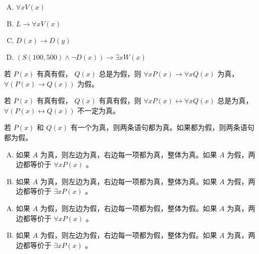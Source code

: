 {{        %
        \begin{practices}
            \begin{enumerate}[A.]
                \item $\forall x V(x)$
                \item $L \rightarrow \forall x V(x)$
                \item $D(x) \rightarrow D(y)$
                \item $(S(100, 500) \wedge \neg D(x)) \rightarrow \exists x W(x)$
            \end{enumerate}
        \end{practices}

        \begin{practices}
            若 $P(x)$ 有真有假， $Q(x)$ 总是为假，则 $\forall x P(x) \rightarrow \forall x Q(x)$ 为真， $\forall (P(x) \rightarrow Q(x))$ 为假。
        \end{practices}

        \begin{practices}
            若 $P(x)$ 有真有假， $Q(x)$ 有真有假，则 $\forall x P(x) \leftrightarrow \forall x Q(x)$ 总是为真， $\forall (P(x) \leftrightarrow Q(x))$ 不一定为真。
        \end{practices}

        \begin{practices}
            若 $P(x)$ 和 $Q(x)$ 有一个为真，则两条语句都为真。如果都为假，则两条语句都为假。
        \end{practices}

        \begin{practices}
            \begin{enumerate}[A.]
                \item 如果 $A$ 为真，则左边为真，右边每一项都为真，整体为真。如果 $A$ 为假，两边都等价于 $\forall x P(x)$ 。
                \item 如果 $A$ 为真，则左边为真，右边每一项都为真，整体为真。如果 $A$ 为假，两边都等价于 $\exists x P(x)$ 。
            \end{enumerate}
        \end{practices}

        \begin{practices}
            \begin{enumerate}[A.]
                \item 如果 $A$ 为假，则左边为假，右边每一项都为假，整体为假。如果 $A$ 为真，两边都等价于 $\forall x P(x)$ 。
                \item 如果 $A$ 为假，则左边为假，右边每一项都为假，整体为假。如果 $A$ 为真，两边都等价于 $\exists x P(x)$ 。
            \end{enumerate}
        \end{practices}

}}
